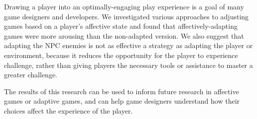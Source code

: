 
Drawing a player into an optimally-engaging play experience is a goal of many game designers and developers. We investigated various approaches to adjusting games based on a player's affective state and found that affectively-adapting games were more arousing than the non-adapted version. We also suggest that adapting the NPC enemies is not as effective a strategy as adapting the player or environment, because it reduces the opportunity for the player to experience challenge, rather than giving players the necessary tools or assistance to master a greater challenge.

The results of this research can be used to inform future research in affective games or adaptive games, and can help game designers understand how their choices affect the experience of the player.
